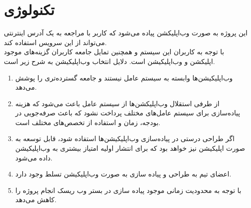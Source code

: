 \section{تکنولوژی}
این پروژه به صورت وب‌اپلیکشن پیاده می‌شود که کاربر با مراجعه به یک آدرس اینترنتی می‌تواند از این سرویس استفاده کند.\\
با توجه به کاربران این سیستم و همچنین تمایل جامعه کاربران گزینه‌های موجود اپلیکشن‌ و وب‌اپلیکیشن‌ است.
دلایل انتخاب وب‌اپلیکیشن به شرح زیر است.
\begin{enumerate}
    \item
    وب‌اپلیکیشن‌ها وابسته به سیستم عامل نیستند و جامعه گسترده‌تری را پوشش 
    می‌دهد.
    \item
    از طرفی استقلال وب‌اپلیکشن‌ها از سیستم عامل باعث می‌شود که هزینه پیاده‌سازی برای سیستم عامل‌های مختلف پرداخت نشود که باعث صرفه‌جویی در بودجه، زمان و استفاده از تخصص‌های مختلف است.
	\item
	اگر طراحی درستی در پیاده‌سازی وب‌اپلیکیشن‌ها استفاده شود، قابل توسعه به صورت اپلیکیشن نیز خواهد بود که برای انتشار اولیه امتیاز بیشتری به وب‌اپلیکیشن داده می‌شود.
	\item
	اعضای تیم به طراحی و پیاده سازی به صورت وب‌اپلیکیشن تسلط وجود دارد.
	\item 
	با توجه به محدودیت زمانی موجود پیاده سازی در بستر وب ریسک انجام پروژه را کاهش می‌دهد.
\end{enumerate}

